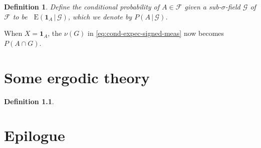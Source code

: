 \documentclass[10pt,oneside]{book}
\numberwithin{equation}{chapter}
\theoremstyle{plain-star}
\theoremstyle{definition-star}
\newtheorem{defn}[equation]{Definition}
\theoremstyle{remark-star}
\theoremstyle{plain-star}
\newcommand{\ind}{\mathbf{1}}
\newcommand{\E}{\mathop{}\!\mathrm{E}}
\newcommand{\giv}{\,|\,}
\newcommand{\F}{\mathcal{F}}
\newcommand{\G}{\mathcal{G}}
\begin{document}

\begin{defn}
    Define the conditional probability of $A \in \F$ given a sub-$\sigma$-field $\G$ of $\F$ to be $\E(\ind_A \giv \G)$, which we denote by $P(A\giv \G)$.
\end{defn}

When $X = \ind_A$, the $\nu(G)$ in \eqref{eq:cond-expec-signed-meas} now becomes $P(A\cap G)$. %

\chapter{Some ergodic theory}
\begin{defn}
    
\end{defn}

\newpage
{}
{}
\chapter*{\Large Epilogue}

\newpage
{}
\printbibliography

\newpage
{}
{}
\printindex
\end{document}
